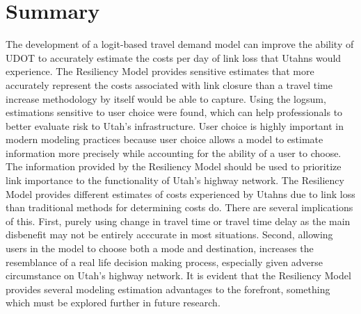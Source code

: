 \section{Summary}

The development of a logit-based travel demand model can improve the
ability of UDOT to accurately estimate the costs per day of link loss that
Utahns would experience. The Resiliency Model provides sensitive
estimates that more accurately represent the costs associated with link
closure than a travel time increase methodology by itself would be able to
capture. Using the logsum, estimations sensitive to user choice were
found, which can help professionals to better evaluate risk to Utah’s
infrastructure. User choice is highly important in modern modeling
practices because user choice allows a model to estimate information more
precisely while accounting for the ability of a user to choose. The information
provided by the Resiliency Model
should be used to prioritize link importance to the functionality of
Utah’s highway network. The Resiliency Model provides different estimates of
costs experienced by Utahns due to link loss than traditional methods for
determining costs do. There are several implications of this. First, purely using change in travel time or travel time delay as the main disbenefit may not be entirely acccurate in most situations. Second, allowing users in the model to choose both a mode and destination, increases the resemblance of a real life decision making process, especially given adverse circumstance on Utah's highway network. It is evident that the Resiliency Model provides several modeling estimation advantages to the forefront, something which must be explored further in future research.
